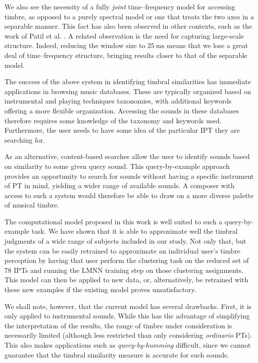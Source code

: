 \documentclass{bmcart}
\begin{document}
We also see the necessity of a fully \emph{joint} time--frequency model for accessing timbre, as opposed to a purely spectral model or one that treats the two axes in a separable manner.
This fact has also been observed in other contexts, such as the work of Patil et al. \cite{patil2012ploscompbiol}.
A related observation is the need for capturing large-scale structure.
Indeed, reducing the window size to $25~\mathrm{ms}$ means that we lose a great deal of time--frequency structure, bringing results closer to that of the separable model.

The success of the above system in identifying timbral similarities has immediate applications in browsing music databases.
These are typically organized based on instrumental and playing techniques taxonomies, with additional keywords offering a more flexible organization.
Accessing the sounds in these databases therefore requires some knowledge of the taxonomy and keywords used.
Furthermore, the user needs to have some idea of the particular IPT they are searching for.

As an alternative, content-based searches allow the user to identify sounds based on similarity to some given query sound.
This query-by-example approach provides an opportunity to search for sounds without having a specific instrument of PT in mind, yielding a wider range of available sounds.
A composer with access to such a system would therefore be able to draw on a more diverse palette of musical timbre.

The computational model proposed in this work is well suited to such a query-by-example task.
We have shown that it is able to approximate well the timbral judgments of a wide range of subjects included in our study.
Not only that, but the system can be easily retrained to approximate an individual user's timbre perception by having that user perform the clustering task on the reduced set of $78$ IPTs and running the LMNN training step on those clustering assignments.
This model can then be applied to new data, or, alternatively, be retrained with these new examples if the existing model proves unsatisfactory.

We shall note, however, that the current model has several drawbacks.
First, it is only applied to instrumental sounds.
While this has the advantage of simplifying the interpretation of the results, the range of timbre under consideration is necessarily limited (although less restricted than only considering \emph{ordinario} PTs).
This also makes applications such as \emph{query-by-humming} difficult, since we cannot guarantee that the timbral similarity measure is accurate for such sounds.
\end{document}
